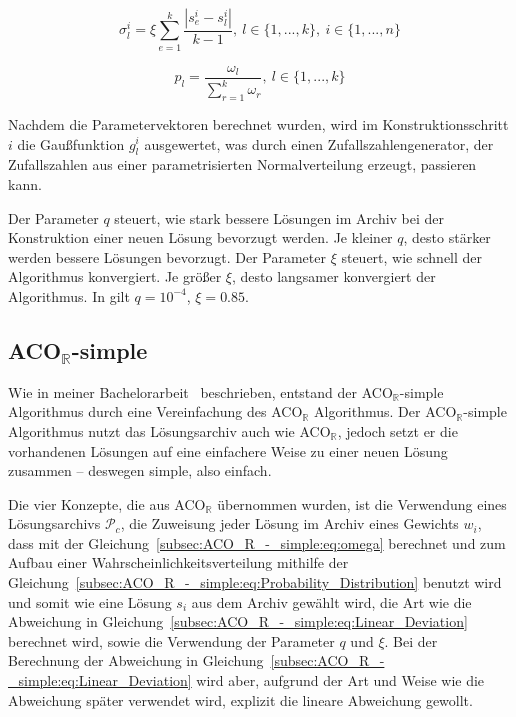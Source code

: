 \documentclass[fontsize=12, a4aper]{scrartcl}
\begin{document}
	\begin{equation} \label{subsec:ACO_R:eq:sigma}
		\sigma^i_l=\xi \sum_{e=1}^{k} \frac{|s^i_e-s^i_l|}{k-1}, ~ l \in \{1, ..., k\}, ~ i \in \{1, ..., n\}
	\end{equation}
	
	\begin{equation} \label{subsec:ACO_R:eq:Probability_Distribution}
		p_l = \frac{\omega_l}{\sum_{r=1}^{k} \omega_r}, ~ 
		l \in \{1, ..., k\}
	\end{equation}
	
	Nachdem die Parametervektoren berechnet wurden, wird im Konstruktionsschritt \(i\) die Gaußfunktion \(g^i_l\) ausgewertet, was durch einen Zufallszahlengenerator, der Zufallszahlen aus einer parametrisierten Normalverteilung erzeugt, passieren kann.\hfill\newline
	
	Der Parameter \(q\) steuert, wie stark bessere Lösungen im Archiv bei der Konstruktion einer neuen Lösung bevorzugt werden. Je kleiner \(q\), desto stärker werden bessere Lösungen bevorzugt. Der Parameter \(\xi\) steuert, wie schnell der Algorithmus konvergiert. Je größer \(\xi\), desto langsamer konvergiert der Algorithmus. In \cite{socha2008ant} gilt \(q = 10^{-4}\), \(\xi = 0.85\).\hfill\newline
	
	\subsection{ACO\(_{\mathbb{R}}\)-simple} \label{subsec:ACO_R_-_simple}
	
	Wie in meiner Bachelorarbeit~\cite{FCM_2019} beschrieben, entstand der ACO\(_{\mathbb{R}}\)-simple Algorithmus durch eine Vereinfachung des ACO\(_\mathbb{R}\) Algorithmus. Der ACO\(_{\mathbb{R}}\)-simple Algorithmus nutzt das Lösungsarchiv auch wie ACO\(_{\mathbb{R}}\), jedoch setzt er die vorhandenen Lösungen auf eine einfachere Weise zu einer neuen Lösung zusammen -- deswegen simple, also einfach.\hfill\newline
	
	Die vier Konzepte, die aus ACO\(_{\mathbb{R}}\) übernommen wurden, ist die Verwendung eines Lösungsarchivs \(\mathcal{P}_c\), die Zuweisung jeder Lösung im Archiv eines Gewichts \(w_i\), dass mit der Gleichung~\ref{subsec:ACO_R_-_simple:eq:omega} berechnet und zum Aufbau einer Wahrscheinlichkeitsverteilung mithilfe der Gleichung~\ref{subsec:ACO_R_-_simple:eq:Probability_Distribution} benutzt wird und somit wie eine Lösung \(s_i\) aus dem Archiv gewählt wird, die Art wie die Abweichung in Gleichung~\ref{subsec:ACO_R_-_simple:eq:Linear_Deviation} berechnet wird, sowie die Verwendung der Parameter \(q\) und \(\xi\). Bei der Berechnung der Abweichung in Gleichung~\ref{subsec:ACO_R_-_simple:eq:Linear_Deviation} wird aber, aufgrund der Art und Weise wie die Abweichung später verwendet wird, explizit die lineare Abweichung gewollt.\hfill\newline
	
\end{document}
